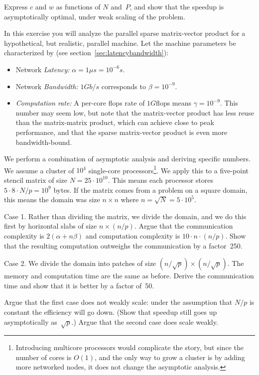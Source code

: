 \begin{exercise}
  Express $c$ and $w$ as functions of $N$ and~$P$, and show that the
  speedup is asymptotically optimal, under weak scaling of the problem.
\end{exercise}

\begin{exercise}
  \label{ex:scale-2d-domain}
  In this exercise you will analyze the parallel sparse matrix-vector
  product for a hypothetical, but realistic, parallel machine.
  Let the machine parameters be characterized by (see
  section~\ref{sec:latencybandwidth}):
  \begin{itemize}
  \item Network {\it Latency:} $\alpha=1\mu s=10^{-6}s$.
  \item Network {\it Bandwidth:} $1Gb/s$ corresponds to $\beta=10^{-9}$.
  \item {\it Computation rate:} A per-core flops rate of $1G$flops
    means $\gamma=10^{-9}$. This number may seem low, but note that the
    matrix-vector product has less reuse than the matrix-matrix
    product, which can achieve close to peak performance,
    and that the sparse matrix-vector product is even more
    bandwidth-bound.
  \end{itemize}
  We perform a combination of asymptotic analysis and deriving specific numbers.
  We assume a cluster of 
  $10^4$ single-core processors\footnote
  {Introducing multicore processors would complicate the story, but
    since the number of cores is $O(1)$, and the only way to grow a
    cluster is by adding more networked nodes, it does not change the
    asymptotic analysis.}. We apply this to a five-point
  stencil matrix of size $N=25\cdot 10^{10}$. This means each
  processor stores $5\cdot 8\cdot N/p=10^9$ bytes. If the matrix comes
  from a problem on a square domain, this means the domain was size
  $n\times n$ where $n=\sqrt N=5\cdot 10^5$.

  Case 1. Rather than dividing the matrix, we divide the domain, and
  we do this first by horizontal slabs of size $n\times (n/p)$. Argue
  that the communication complexity is $2(\alpha+n\beta)$ and
  computation complexity is $10\cdot n\cdot (n/p)$. Show that the
  resulting computation outweighs the communication by a factor~250.

  Case 2. We divide the domain into patches of size
  $(n/\sqrt p)\times (n/\sqrt p)$.
  The memory and computation time are the same as
  before. Derive the communication time and show that it is better by
  a factor of~50. 

  Argue that the first case does not weakly scale: under the
  assumption that $N/p$ is constant the efficiency will go down. 
  (Show that speedup still goes up asymptotically as~$\sqrt p$.)
  Argue that the second case does scale weakly.
\end{exercise}

